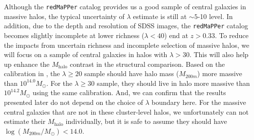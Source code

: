 \documentclass{emulateapj}
\def\redm{\texttt{redMaPPer}}
\def\mhalo{{$M_{\mathrm{halo}}$}}
\begin{document}
\begin{CJK*}{UTF8}{gbsn}
    Although the \redm{} catalog provides us a good sample of central galaxies in 
    massive halos, the typical uncertainty of $\lambda$ estimate is still at 
    $\sim 5$-10 level.  
    In addition, due to the depth and resolution of SDSS images, the \redm{} catalog 
    becomes slightly incomplete at lower richness ($\lambda < 40$) end at $z > 0.33$.
    To reduce the impacts from uncertain richness and incomplete selection of 
    massive halos, we will focus on a sample of central galaxies in halos with 
    $\lambda > 30$. 
    This will also help up enhance the \mhalo{} contrast in the structural comparison.     
    Based on the calibration in \citet{Simet2016}, the $\lambda \geq 20$ sample should
    have halo mass ($M_{200m}$) more massive than $10^{14.0} M_{\odot}$.  
    For the $\lambda \geq 30$ sample, they should live in halo more massive than
    $10^{14.2} M_{\odot}$ using the same calibration. 
    And, we can confirm that the results presented later do not depend on the choice 
    of $\lambda$ boundary here. 
    For the massive central galaxies that are not in these cluster-level halos, 
    we unfortunately can not estimate their \mhalo{} individually, but it is safe 
    to assume they should have $\log (M_{200m}/M_{\odot}) < 14.0$.     
    


\end{CJK*}
\end{document}
